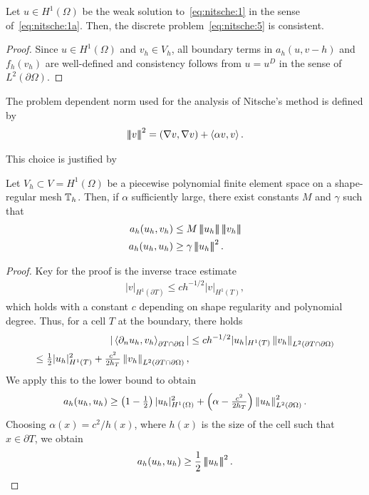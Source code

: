 \begin{corollary}
  Let $u \in H^1(\Omega)$ be the weak solution to~\eqref{eq:nitsche:1}
  in the sense of~\eqref{eq:nitsche:1a}. Then, the discrete
  problem~\eqref{eq:nitsche:5} is consistent.
\end{corollary}

\begin{proof}
  Since $u \in H^1(\Omega)$ and $v_h\in V_h$, all boundary terms in
  $a_h(u,v-h)$ and $f_h(v_h)$ are well-defined and consistency follows
  from $u=u^D$ in the sense of $L^2(\partial\Omega)$.
\end{proof}

\begin{definition}
  The problem dependent norm used for the analysis of Nitsche's method
  is defined by
  \begin{gather}
    \tnorm{v}^2 = \form(\nabla v,\nabla v) + \forme(\alpha v,v).
  \end{gather}
\end{definition}

This choice is justified by
\begin{lemma}
  Let $V_h \subset V = H^1(\Omega)$ be a piecewise polynomial finite
  element space on a shape-regular mesh $\mathbb T_h$. Then, if $\alpha$
  sufficiently large, there exist constants $M$ and $\gamma$ such that
  \begin{align*}
    a_h(u_h, v_h) &\le M \tnorm{u_h}\tnorm{v_h}\\
    a_h(u_h,u_h) &\ge \gamma \tnorm{u_h}^2.
  \end{align*}
\end{lemma}

\begin{proof}
  Key for the proof is the inverse trace estimate
  \begin{gather*}
    |v|_{H^1(\partial T)} \le c h^{-1/2} |v|_{H^1(T)},
  \end{gather*}
  which holds with a constant $c$ depending on shape regularity and
  polynomial degree. Thus, for a cell $T$ at the boundary, there holds
  \begin{align*}
    |\forme(\partial_n u_h, v_h)_{\partial T \cap \partial\Omega}|
    & \le c h^{-1/2} |u_h|_{H^1(T)} \norm{v_h}_{L^2(\partial T \cap \partial\Omega)}
    \\
    \le \tfrac{1}{2} |u_h|_{H^1(T)}^2
    + \tfrac{c^2}{2h_T}\norm{v_h}_{L^2(\partial T \cap \partial\Omega)},
  \end{align*}
  We apply this to the lower bound to obtain
  \begin{gather*}
    a_h(u_h, u_h) \ge \left(1-\tfrac{1}{2}\right)
    |u_h|_{H^1(\Omega)}^2
    + \left(\alpha - \tfrac{c^2}{2h_T}\right)
    \left\|u_h\right\|_{L^2(\partial\Omega)}^2.
  \end{gather*}
  Choosing $\alpha(x) = c^2/h(x)$, where $h(x)$ is the size of the
  cell such that $x\in\partial T$, we obtain
  \begin{gather*}
    a_h(u_h, u_h) \ge \frac12 \left|\!\left|\!\left|u_h\right|\!\right|\!\right|^2.
  \end{gather*}
\end{proof}

